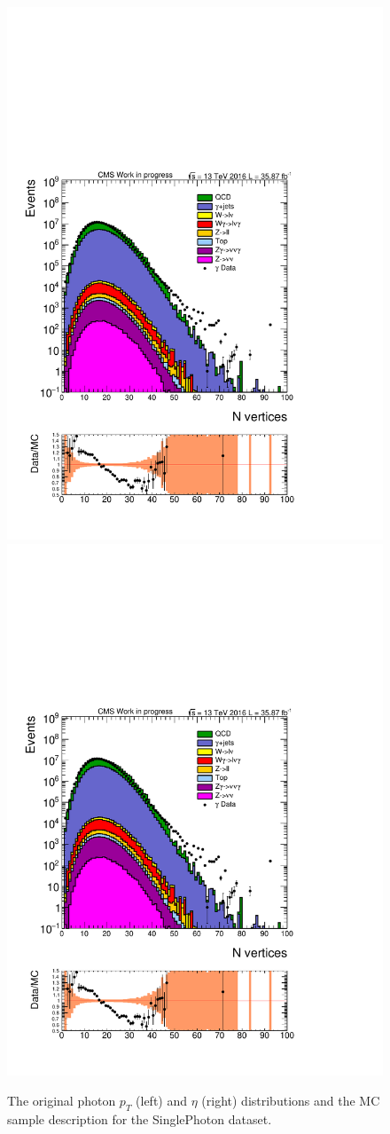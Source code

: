 \begin{figure}[htbp!]
\centering
\includegraphics[width=0.48\linewidth, page=3]{figures/ReMiniAODSummer16HLT_FixXsec_SepProc_PhPtWt_tight_puWeightsummer16_unblind_log_.pdf}
\includegraphics[width=0.48\linewidth, page=4]{figures/ReMiniAODSummer16HLT_FixXsec_SepProc_PhPtWt_tight_puWeightsummer16_unblind_log_.pdf}
\caption{The original photon $p_T$ (left) and $\eta$ (right) distributions and the MC sample description for the SinglePhoton dataset. }
\label{fig:pho_pteta}
\end{figure}

